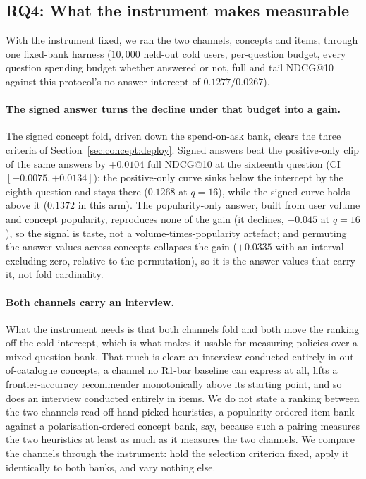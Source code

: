 \documentclass[manuscript,screen,review]{acmart}
\begin{document}
\subsection{RQ4: What the instrument makes measurable}\label{sec:res:concept}

With the instrument fixed, we ran the two channels, concepts and items, through one fixed-bank harness ($10{,}000$ held-out cold users, per-question budget, every question spending budget whether answered or not, full and tail NDCG@10 against this protocol's no-answer intercept of $0.1277/0.0267$).

\paragraph{The signed answer turns the decline under that budget into a gain.} The signed concept fold, driven down the spend-on-ask bank, clears the three criteria of Section~\ref{sec:concept:deploy}. Signed answers beat the positive-only clip of the same answers by $+0.0104$ full NDCG@10 at the sixteenth question (CI $[+0.0075,+0.0134]$): the positive-only curve sinks below the intercept by the eighth question and stays there ($0.1268$ at $q{=}16$), while the signed curve holds above it ($0.1372$ in this arm). The popularity-only answer, built from user volume and concept popularity, reproduces none of the gain (it declines, $-0.045$ at $q{=}16$), so the signal is taste, not a volume-times-popularity artefact; and permuting the answer values across concepts collapses the gain ($+0.0335$ with an interval excluding zero, relative to the permutation), so it is the answer values that carry it, not fold cardinality.

\paragraph{Both channels carry an interview.} What the instrument needs is that both channels fold and both move the ranking off the cold intercept, which is what makes it usable for measuring policies over a mixed question bank. That much is clear: an interview conducted entirely in out-of-catalogue concepts, a channel no R1-bar baseline can express at all, lifts a frontier-accuracy recommender monotonically above its starting point, and so does an interview conducted entirely in items. We do not state a ranking between the two channels read off hand-picked heuristics, a popularity-ordered item bank against a polarisation-ordered concept bank, say, because such a pairing measures the two heuristics at least as much as it measures the two channels. We compare the channels through the instrument: hold the selection criterion fixed, apply it identically to both banks, and vary nothing else.
\end{document}
